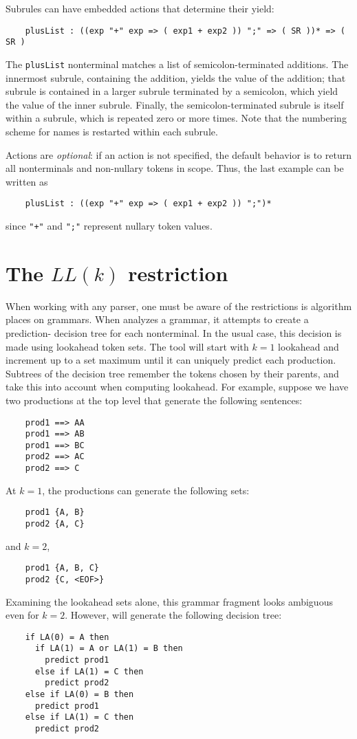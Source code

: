 Subrules can have embedded actions that determine their yield:
\begin{verbatim}
    plusList : ((exp "+" exp => ( exp1 + exp2 )) ";" => ( SR ))* => ( SR )
\end{verbatim}
The {\tt plusList} nonterminal matches a list of semicolon-terminated additions.  The innermost subrule, containing the addition, yields the value of the addition; that subrule is contained in a larger subrule terminated by a semicolon, which yield the value of the inner subrule.  Finally, the semicolon-terminated subrule is itself within a subrule, which is repeated zero or more times.  Note that the numbering scheme for names is restarted within each subrule.

Actions are \emph{optional}: if an action is not specified, the default behavior is to return all nonterminals and non-nullary tokens in scope.  Thus, the last example can be written as 
\begin{verbatim}
    plusList : ((exp "+" exp => ( exp1 + exp2 )) ";")*
\end{verbatim}
since {\tt "+"} and {\tt ";"} represent nullary token values.

\section{The $LL(k)$ restriction}\label{sec:antlr-llk}

When working with any parser, one must be aware of the restrictions is algorithm places on grammars.
When \antlr{} analyzes a grammar, it attempts to create a prediction-
decision tree for each nonterminal.  In the usual case, this decision
is made using lookahead token sets.  The tool will start with $k = 1$
lookahead and increment up to a set maximum until it can
uniquely predict each production.  Subtrees of the decision tree
remember the tokens chosen by their parents, and take this into account
when computing lookahead.  For example, suppose we have two productions
at the top level that generate the following sentences:
\begin{verbatim}
    prod1 ==> AA
    prod1 ==> AB
    prod1 ==> BC
    prod2 ==> AC
    prod2 ==> C
\end{verbatim}
At $k = 1$, the productions can generate the following sets:
\begin{verbatim}
    prod1 {A, B}
    prod2 {A, C}
\end{verbatim}
and $k = 2$,
\begin{verbatim}
    prod1 {A, B, C}
    prod2 {C, <EOF>}
\end{verbatim}
Examining the lookahead sets alone, this grammar fragment looks ambiguous
even for $k = 2$.  However, \antlr{} will generate the following decision
tree:
\begin{verbatim}
    if LA(0) = A then
      if LA(1) = A or LA(1) = B then
        predict prod1
      else if LA(1) = C then
        predict prod2
    else if LA(0) = B then
      predict prod1
    else if LA(1) = C then
      predict prod2
\end{verbatim}

